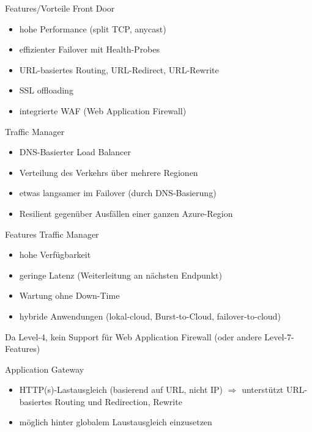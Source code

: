 \begin{flashcard}[]{Features/Vorteile Front Door}
  \begin{itemize}
    \item hohe Performance (split TCP, anycast)
    \item effizienter Failover mit Health-Probes
    \item URL-basiertes Routing, URL-Redirect, URL-Rewrite
    \item SSL offloading
    \item integrierte WAF (Web Application Firewall)
  \end{itemize}
\end{flashcard}

\begin{flashcard}[]{Traffic Manager}
  \begin{itemize}
    \item DNS-Basierter Load Balancer
    \item Verteilung des Verkehrs über mehrere Regionen
    \item etwas langsamer im Failover (durch DNS-Basierung)
    \item Resilient gegenüber Ausfällen einer ganzen Azure-Region
  \end{itemize}
\end{flashcard}

\begin{flashcard}[]{Features Traffic Manager}
  \begin{itemize}
    \item hohe Verfügbarkeit
    \item geringe Latenz (Weiterleitung an nächsten Endpunkt)
    \item Wartung ohne Down-Time
    \item hybride Anwendungen (lokal-cloud, Burst-to-Cloud, failover-to-cloud)
  \end{itemize}
  Da Level-4, kein Support für Web Application Firewall (oder andere Level-7-Features)
\end{flashcard}

\begin{flashcard}[]{Application Gateway}
  \begin{itemize}
    \item HTTP(s)-Lastausgleich (basierend auf URL, nicht IP)\newline
      $\Rightarrow$ unterstützt URL-basiertes Routing und Redirection, Rewrite
    \item möglich hinter globalem Laustausgleich einzusetzen
  \end{itemize}
\end{flashcard}

